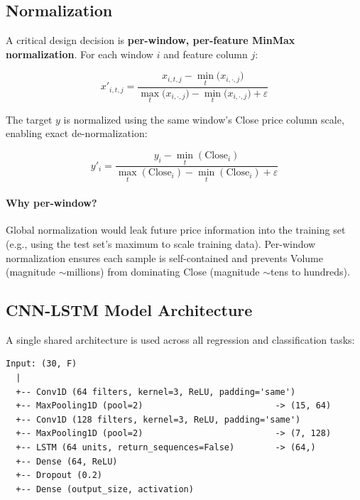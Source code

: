 \documentclass[12pt,a4paper]{article}
\begin{document}
\subsection{Normalization}

A critical design decision is \textbf{per-window, per-feature MinMax
normalization}. For each window $i$ and feature column $j$:

\begin{equation}
  x'_{i,t,j} = \frac{x_{i,t,j} - \min_t\bigl(x_{i,\cdot,j}\bigr)}
                    {\max_t\bigl(x_{i,\cdot,j}\bigr)
                     - \min_t\bigl(x_{i,\cdot,j}\bigr) + \varepsilon}
\end{equation}

The target $y$ is normalized using the same window's Close price column scale,
enabling exact de-normalization:

\begin{equation}
  y'_i = \frac{y_i - \min_t(\text{Close}_i)}
              {\max_t(\text{Close}_i) - \min_t(\text{Close}_i) + \varepsilon}
\end{equation}

\paragraph{Why per-window?}
Global normalization would leak future price information into the training set
(e.g., using the test set's maximum to scale training data). Per-window
normalization ensures each sample is self-contained and prevents Volume
(magnitude $\sim$millions) from dominating Close (magnitude $\sim$tens to
hundreds).

\subsection{CNN-LSTM Model Architecture}

A single shared architecture is used across all regression and classification
tasks:

\begin{lstlisting}[style=plain, caption={CNN-LSTM architecture}]
Input: (30, F)
  |
  +-- Conv1D (64 filters, kernel=3, ReLU, padding='same')
  +-- MaxPooling1D (pool=2)                          -> (15, 64)
  +-- Conv1D (128 filters, kernel=3, ReLU, padding='same')
  +-- MaxPooling1D (pool=2)                          -> (7, 128)
  +-- LSTM (64 units, return_sequences=False)        -> (64,)
  +-- Dense (64, ReLU)
  +-- Dropout (0.2)
  +-- Dense (output_size, activation)
\end{lstlisting}
\end{document}

